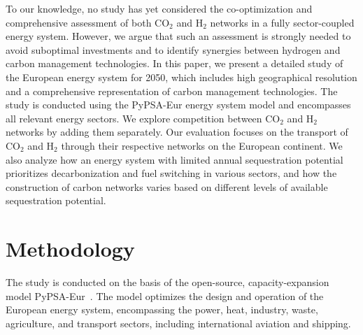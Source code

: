 \documentclass[twocolumn]{article}
\newcommand{\carbon}{CO$_2$}
\newcommand{\hydrogen}{H$_2$}
\begin{document}
To our knowledge, no study has yet considered the co-optimization and comprehensive assessment of both \carbon{} and \hydrogen{} networks in a fully sector-coupled energy system. However, we argue that such an assessment is strongly needed to avoid suboptimal investments and to identify synergies between hydrogen and carbon management technologies. In this paper, we present a detailed study of the European energy system for 2050, which includes high geographical resolution and a comprehensive representation of carbon management technologies. The study is conducted using the PyPSA-Eur energy system model and encompasses all relevant energy sectors. We explore competition between \carbon{} and \hydrogen{} networks by adding them separately. Our evaluation focuses on the transport of \carbon{} and \hydrogen{} through their respective networks on the European continent. We also analyze how an energy system with limited annual sequestration potential prioritizes decarbonization and fuel switching in various sectors, and how the construction of carbon networks varies based on different levels of available sequestration potential.


\section{Methodology}
\label{sec:methodology}

The study is conducted on the basis of the open-source, capacity-expansion model PyPSA-Eur~\cite{horschPyPSAEurOpenOptimisation2018,brownSynergiesSectorCoupling2018,PyPSAEurSecSectorCoupledOpen2023}.
The model optimizes the design and operation of the European energy system, encompassing the power, heat, industry, waste, agriculture, and transport sectors, including international aviation and shipping.
\end{document}
